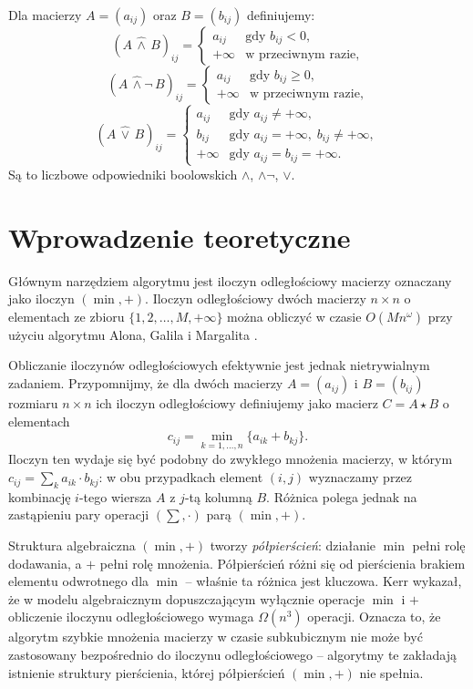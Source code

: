 \begin{definicja}
Dla macierzy $A = (a_{ij})$ oraz $B = (b_{ij})$ definiujemy:
\[
(A \,\hat{\wedge}\, B)_{ij} = \begin{cases}
a_{ij} & \text{gdy } b_{ij} < 0, \\
+\infty & \text{w przeciwnym razie,}
\end{cases}
\]
\[
(A \,\hat{\wedge}\neg\, B)_{ij} = \begin{cases}
a_{ij} & \text{gdy } b_{ij} \geq 0, \\
+\infty & \text{w przeciwnym razie,}
\end{cases}
\]
\[
(A \,\hat{\vee}\, B)_{ij} = \begin{cases}
a_{ij} & \text{gdy } a_{ij} \neq +\infty, \\
b_{ij} & \text{gdy } a_{ij} = +\infty,\; b_{ij} \neq +\infty, \\
+\infty & \text{gdy } a_{ij} = b_{ij} = +\infty.
\end{cases}
\]
Są to liczbowe odpowiedniki boolowskich $\wedge$, $\wedge\neg$, $\vee$.
\end{definicja}

\section{Wprowadzenie teoretyczne}

Głównym narzędziem algorytmu jest iloczyn odległościowy macierzy oznaczany jako iloczyn $(\min, +)$. Iloczyn odległościowy dwóch macierzy $n \times n$ o elementach ze zbioru $\{1, 2, \ldots, M, +\infty\}$ można obliczyć w czasie $O(Mn^\omega)$ przy użyciu algorytmu Alona, Galila i Margalita \cite{Alon}.

Obliczanie iloczynów odległościowych efektywnie jest jednak nietrywialnym zadaniem.
Przypomnijmy, że dla dwóch macierzy $A = (a_{ij})$ i $B = (b_{ij})$
rozmiaru $n \times n$ ich iloczyn odległościowy definiujemy jako macierz
$C = A \star B$ o elementach
\[
c_{ij} = \min_{k=1,\ldots,n} \{a_{ik} + b_{kj}\}.
\]
Iloczyn ten wydaje się być podobny do zwykłego mnożenia
macierzy, w którym $c_{ij} = \sum_k a_{ik} \cdot b_{kj}$: w obu przypadkach
element $(i,j)$ wyznaczamy przez kombinację $i$-tego wiersza $A$
z $j$-tą kolumną $B$. Różnica polega jednak na zastąpieniu
pary operacji $(\sum, \cdot)$ parą $(\min, +)$.

Struktura algebraiczna $(\min, +)$ tworzy \emph{półpierścień}: działanie
$\min$ pełni rolę dodawania, a $+$ pełni rolę mnożenia. Półpierścień
różni się od pierścienia brakiem elementu odwrotnego dla $\min$ -- właśnie ta różnica jest
kluczowa. Kerr \cite{Kerr1970} wykazał, że w modelu algebraicznym
dopuszczającym wyłącznie operacje $\min$ i $+$ obliczenie iloczynu
odległościowego wymaga $\Omega(n^3)$ operacji. Oznacza to, że algorytm
szybkie mnożenia macierzy w czasie subkubicznym\cite{Alman2024} nie może
być zastosowany bezpośrednio do iloczynu odległościowego -- algorytmy
te zakładają istnienie struktury pierścienia, której półpierścień
$(\min, +)$ nie spełnia.

